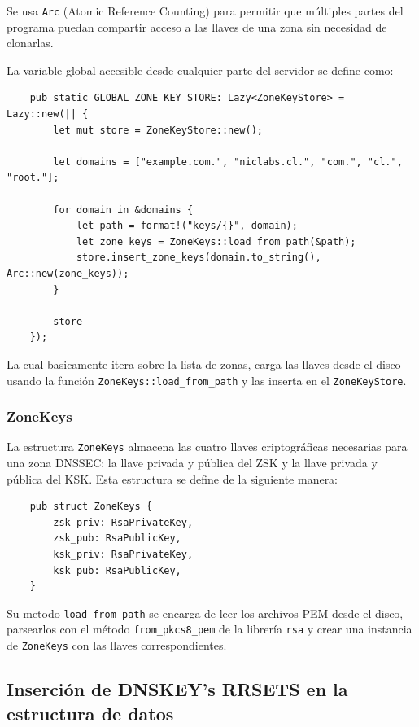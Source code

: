 Se usa \texttt{Arc} (Atomic Reference Counting) para permitir que múltiples partes del programa puedan compartir acceso a las llaves de una zona sin necesidad de clonarlas.

La variable global accesible desde cualquier parte del servidor se define como:

\begin{lstlisting}
    pub static GLOBAL_ZONE_KEY_STORE: Lazy<ZoneKeyStore> = Lazy::new(|| {
        let mut store = ZoneKeyStore::new();

        let domains = ["example.com.", "niclabs.cl.", "com.", "cl.", "root."];

        for domain in &domains {
            let path = format!("keys/{}", domain);
            let zone_keys = ZoneKeys::load_from_path(&path);
            store.insert_zone_keys(domain.to_string(), Arc::new(zone_keys));
        }

        store
    });
\end{lstlisting}

La cual basicamente itera sobre la lista de zonas, carga las llaves desde el disco usando la función \texttt{ZoneKeys::load\_from\_path}
y las inserta en el \texttt{ZoneKeyStore}.

\subsubsection{ZoneKeys}

La estructura \texttt{ZoneKeys} almacena las cuatro llaves criptográficas necesarias para una zona DNSSEC: la llave privada y pública del ZSK
y la llave privada y pública del KSK. Esta estructura se define de la siguiente manera:\\

\begin{lstlisting}
    pub struct ZoneKeys {
        zsk_priv: RsaPrivateKey,
        zsk_pub: RsaPublicKey,
        ksk_priv: RsaPrivateKey,
        ksk_pub: RsaPublicKey,
    }
\end{lstlisting}

Su metodo \texttt{load\_from\_path} se encarga de leer los archivos PEM desde el disco, parsearlos con el método \texttt{from\_pkcs8\_pem} de la librería \texttt{rsa}
y crear una instancia de \texttt{ZoneKeys} con las llaves correspondientes.

\subsection{Inserción de DNSKEY's RRSETS en la estructura de datos}

